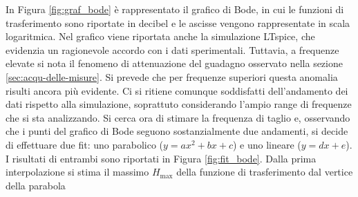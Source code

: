 \documentclass[a4paper,11pt]{article}
\begin{document}
\noindent In Figura \ref{fig:graf_bode} è rappresentato il grafico di Bode, in cui le funzioni di trasferimento sono riportate in decibel e
le ascisse vengono rappresentate in scala logaritmica. Nel grafico viene riportata anche la simulazione LTspice, che
evidenzia un ragionevole accordo con i dati sperimentali. Tuttavia, a frequenze elevate si nota il fenomeno di attenuazione del guadagno osservato nella sezione \ref{sec:acqu-delle-misure}. Si prevede che per frequenze superiori questa anomalia
risulti ancora più evidente. Ci si ritiene comunque soddisfatti dell'andamento dei dati rispetto alla simulazione, soprattuto considerando l'ampio range di frequenze  che si sta analizzando.
Si cerca ora di stimare la frequenza di taglio e, osservando che i punti del grafico di Bode seguono sostanzialmente due andamenti, si decide di effettuare due fit: uno parabolico ($y=a x^{2}+b x + c$) e uno lineare ($y=d x+ e$). I risultati di entrambi sono riportati in Figura \ref{fig:fit_bode}.
Dalla prima interpolazione si stima il massimo $H_{\text{max}}$ della funzione di trasferimento dal vertice della parabola
\end{document}
